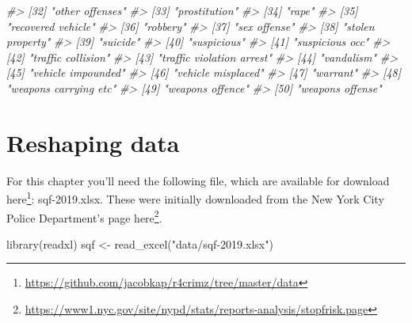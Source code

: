\documentclass[
]{krantz}
\makeatletter
\newenvironment{Shaded}{\begin{snugshade}}{\end{snugshade}}
\newcommand{\CommentTok}[1]{\textcolor[rgb]{0.37,0.37,0.37}{\textit{#1}}}
\newcommand{\FunctionTok}[1]{\textcolor[rgb]{0,0,0}{#1}}
\newcommand{\NormalTok}[1]{#1}
\newcommand{\OtherTok}[1]{\textcolor[rgb]{0.37,0.37,0.37}{#1}}
\newcommand{\StringTok}[1]{\textcolor[rgb]{0.5,0.5,0.5}{#1}}
\renewcommand{\href}[2]{#2\footnote{\url{#1}}}
\newenvironment{kframe}{%
\medskip{}
\setlength{\fboxsep}{.8em}
 \def\at@end@of@kframe{}%
 \ifinner\ifhmode%
  \def\at@end@of@kframe{\end{minipage}}%
  \begin{minipage}{\columnwidth}%
 \fi\fi%
 \def\FrameCommand##1{\hskip\@totalleftmargin \hskip-\fboxsep
 \colorbox{shadecolor}{##1}\hskip-\fboxsep
     \hskip-\linewidth \hskip-\@totalleftmargin \hskip\columnwidth}%
 \MakeFramed {\advance\hsize-\width
   \@totalleftmargin\z@ \linewidth\hsize
   \@setminipage}}%
 {\par\unskip\endMakeFramed%
 \at@end@of@kframe}
\renewenvironment{Shaded}{\begin{kframe}}{\end{kframe}}
\makeatother
\begin{document}
\begin{Shaded}
\begin{Highlighting}[]
\CommentTok{\#\textgreater{} [32] "other offenses"                            }
\CommentTok{\#\textgreater{} [33] "prostitution"                              }
\CommentTok{\#\textgreater{} [34] "rape"                                      }
\CommentTok{\#\textgreater{} [35] "recovered vehicle"                         }
\CommentTok{\#\textgreater{} [36] "robbery"                                   }
\CommentTok{\#\textgreater{} [37] "sex offense"                               }
\CommentTok{\#\textgreater{} [38] "stolen property"                           }
\CommentTok{\#\textgreater{} [39] "suicide"                                   }
\CommentTok{\#\textgreater{} [40] "suspicious"                                }
\CommentTok{\#\textgreater{} [41] "suspicious occ"                            }
\CommentTok{\#\textgreater{} [42] "traffic collision"                         }
\CommentTok{\#\textgreater{} [43] "traffic violation arrest"                  }
\CommentTok{\#\textgreater{} [44] "vandalism"                                 }
\CommentTok{\#\textgreater{} [45] "vehicle impounded"                         }
\CommentTok{\#\textgreater{} [46] "vehicle misplaced"                         }
\CommentTok{\#\textgreater{} [47] "warrant"                                   }
\CommentTok{\#\textgreater{} [48] "weapons carrying etc"                      }
\CommentTok{\#\textgreater{} [49] "weapons offence"                           }
\CommentTok{\#\textgreater{} [50] "weapons offense"}
\end{Highlighting}
\end{Shaded}

\hypertarget{reshaping}{%
\chapter{Reshaping data}\label{reshaping}}

For this chapter you'll need the following file, which are available for download \href{https://github.com/jacobkap/r4crimz/tree/master/data}{here}: sqf-2019.xlsx. These were initially downloaded from the New York City Police Department's page \href{https://www1.nyc.gov/site/nypd/stats/reports-analysis/stopfrisk.page}{here}.

\begin{Shaded}
\begin{Highlighting}[]
\FunctionTok{library}\NormalTok{(readxl)}
\NormalTok{sqf }\OtherTok{\textless{}{-}} \FunctionTok{read\_excel}\NormalTok{(}\StringTok{"data/sqf{-}2019.xlsx"}\NormalTok{)}
\end{Highlighting}
\end{Shaded}
\end{document}
